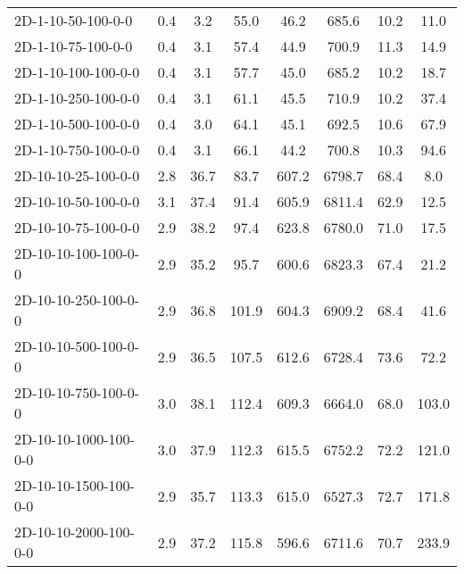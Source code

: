 \documentclass{article}
\begin{document}
\begin{center}
\begin{table}[h]
\begin{tabular}{|l||c|c|c|c|c|c|c|}
            2D-1-10-50-100-0-0             & 0.4  & 3.2       & 55.0       & 46.2        & 685.6    & 10.2      & 11.0       \\
            2D-1-10-75-100-0-0             & 0.4  & 3.1       & 57.4       & 44.9        & 700.9    & 11.3      & 14.9       \\
            2D-1-10-100-100-0-0            & 0.4  & 3.1       & 57.7       & 45.0        & 685.2    & 10.2      & 18.7       \\
            2D-1-10-250-100-0-0            & 0.4  & 3.1       & 61.1       & 45.5        & 710.9    & 10.2      & 37.4       \\
            2D-1-10-500-100-0-0            & 0.4  & 3.0       & 64.1       & 45.1        & 692.5    & 10.6      & 67.9       \\
            2D-1-10-750-100-0-0            & 0.4  & 3.1       & 66.1       & 44.2        & 700.8    & 10.3      & 94.6       \\
            \hline
            2D-10-10-25-100-0-0            & 2.8  & 36.7      & 83.7       & 607.2       & 6798.7   & 68.4      & 8.0        \\
            2D-10-10-50-100-0-0            & 3.1  & 37.4      & 91.4       & 605.9       & 6811.4   & 62.9      & 12.5       \\
            2D-10-10-75-100-0-0            & 2.9  & 38.2      & 97.4       & 623.8       & 6780.0   & 71.0      & 17.5       \\
            2D-10-10-100-100-0-0           & 2.9  & 35.2      & 95.7       & 600.6       & 6823.3   & 67.4      & 21.2       \\
            2D-10-10-250-100-0-0           & 2.9  & 36.8      & 101.9      & 604.3       & 6909.2   & 68.4      & 41.6       \\
            2D-10-10-500-100-0-0           & 2.9  & 36.5      & 107.5      & 612.6       & 6728.4   & 73.6      & 72.2       \\
            2D-10-10-750-100-0-0           & 3.0  & 38.1      & 112.4      & 609.3       & 6664.0   & 68.0      & 103.0      \\
            2D-10-10-1000-100-0-0          & 3.0  & 37.9      & 112.3      & 615.5       & 6752.2   & 72.2      & 121.0      \\
            2D-10-10-1500-100-0-0          & 2.9  & 35.7      & 113.3      & 615.0       & 6527.3   & 72.7      & 171.8      \\
            2D-10-10-2000-100-0-0          & 2.9  & 37.2      & 115.8      & 596.6       & 6711.6   & 70.7      & 233.9      \\

\end{tabular}
\end{table}
\end{center}
\end{document}
